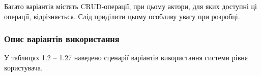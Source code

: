 Багато варіантів містять CRUD-операції, при цьому актори, для яких доступні ці операції, відрізняється. Слід приділити цьому особливу увагу при розробці.
\bigbreak
\subsubsection{Опис варіантів використання}
\bigbreak
У таблицях 1.2 -- 1.27 наведено сценарії варіантів використання системи рівня користувача.

\newcommand{\rowspan}[2]{
 \multirow{1}{*}[
  \dimexpr#1 / 2\relax
 ]{#2}
}

\newlength{\spanHeight}
\newbox\tmpparbox

\tablefirsthead{}
\tablelasttail{}
\tabletail{\hline}
\newcommand{\usecase}[9]{

 \stepcounter{usecase_c}
 \setcounter{scenario_c}{0}
 \setcounter{extension_c}{0}
 \setcounter{extension_for}{1}
 \setlength{\spanHeight}{0pt}

 \tablabel{#1}

 \nopagebreak[4]
 \begin{supertabular}{|p{4.6cm}|p{12.8cm}|}
 \hline Діючі особи & #2 \\
 \hline Область дії & #3 \\
 \hline Рівень & #4 \\
 \hline Учасники та інтереси & #5 \\
 \hline Передумови & #6 \\
 \hline Гарантії успіху & #7 \\
 \hline
 #8
 \hline
 #9
 \hline
 \end{supertabular}
 \\[-3mm]
 \FloatBarrier
}
\def\auth{аутентифікований та авторизований}
\newcommand{\scenario}[1]{\stepcounter{scenario_c} &
 \global\sbox{\tmpparbox}{\parbox{11.9cm}{\arabic{scenario_c}. #1.}}
 \global\addtolength{\spanHeight}{\ht\tmpparbox}
 \global\addtolength{\spanHeight}{7pt}
 \arabic{scenario_c}. #1. \\ \cline{2-2}
}
\newcommand{\lastscenario}[1]{\stepcounter{scenario_c} \rowspan{\spanHeight}{Основний сценарій} \global\setlength{\spanHeight}{0pt} & \arabic{scenario_c}. #1. \\}
\newcommand{\extensionfor}[1]{\setcounter{extensionset_c}{0} \setcounter{extension_for}{\numexpr#1\relax}}
